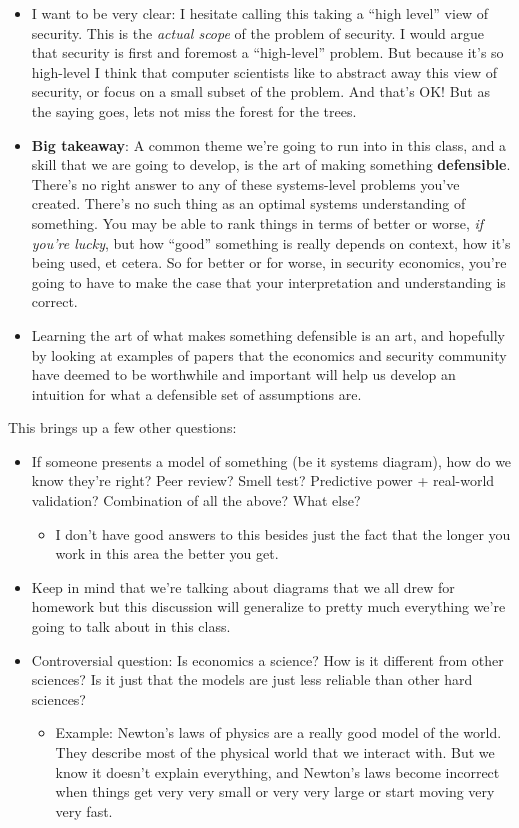 \documentclass[11pt]{article}
\begin{document}
\begin{itemize}
    \item I want to be very clear: I hesitate calling this taking a  ``high level'' view of security. This is the {\it actual scope} of the problem of security.  I would argue that security is first and foremost a ``high-level'' problem. But because it's so high-level I think that computer scientists like to abstract away this view of security, or focus on a small subset of the problem. And that's OK! But as the saying goes, lets not miss the forest for the trees.
    \item {\bf Big takeaway}: A common theme we're going to run into in this class, and a skill that we are going to develop, is the art of making something {\bf defensible}. There's no right answer to any of these systems-level problems you've created. There's no such thing as an optimal systems understanding of something. You may be able to rank things in terms of better or worse, {\it if you're lucky}, but how ``good'' something is really depends on context, how it's being used, et cetera. So for better or for worse, in security economics, you're going to have to make the case that your interpretation and understanding is correct. 
    \item Learning the art of what makes something defensible is an art, and hopefully by looking at examples of papers that the economics and security community have deemed to be worthwhile and important will help us develop an intuition for what a defensible set of assumptions are. 
\end{itemize}

This brings up a few other questions:
\begin{itemize}
    \item If someone presents a model of something (be it systems diagram), how do we know they're right? Peer review? Smell test? Predictive power + real-world validation? Combination of all the above? What else?
    \begin{itemize}
        \item I don't have good answers to this besides just the fact that the longer you work in this area the better you get.  
    \end{itemize}
    \item Keep in mind that we're talking about diagrams that we all drew for homework but this discussion will generalize to pretty much everything we're going to talk about in this class. 
    \item Controversial question: Is economics a science? How is it different from other sciences? Is it just that the models are just less reliable than other hard sciences? 
    \begin{itemize}
        \item Example: Newton's laws of physics are a really good model of the world. They describe most of the physical world that we interact with. But we know it doesn't explain everything, and Newton's laws become incorrect when things get very very small or very very large or start moving very very fast. 
    \end{itemize}
\end{itemize}
\end{document}
